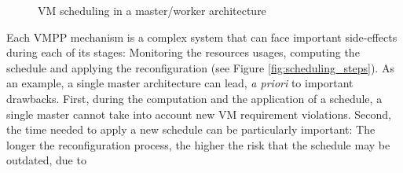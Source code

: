 \documentclass[conference]{IEEEtran}
\begin{document}
%
\begin{figure}[ht]
\vspace*{-.2cm}
\begin{center}
        \subcapcentertrue
\vspace*{-.2cm}
\caption{VM scheduling in a master/worker architecture}
\end{center}
\label{fig:scheduling}
\vspace*{-.2cm}
\end{figure}
%
Each VMPP mechanism is a complex system that can face
important side-effects during each of its stages: Monitoring the
resources usages, computing the schedule and applying the
reconfiguration (see Figure \ref{fig:scheduling_steps}).
%
%
As an example, a single master architecture can lead, \textit{a priori} to
important drawbacks. First, during the computation and the application
of a schedule, a single master cannot take into account new VM
requirement violations. Second, the time needed to apply a new
schedule can be particularly important: The longer the reconfiguration
process, the higher the risk that the schedule may be outdated, due to
\end{document}
